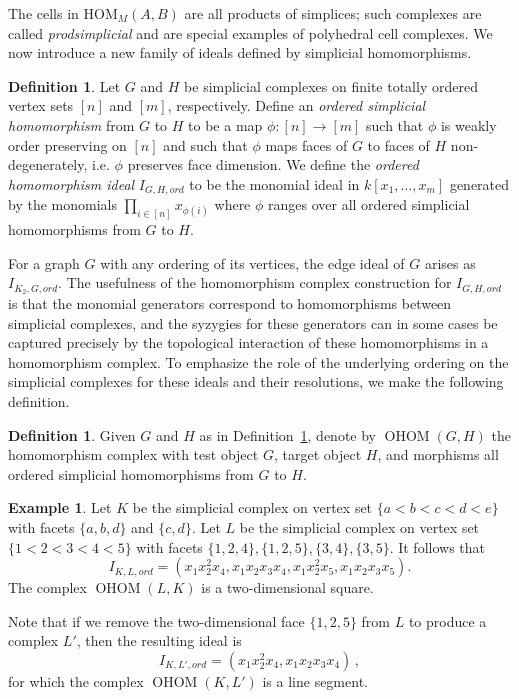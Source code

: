 \documentclass[11pt]{amsart}
\theoremstyle{definition}
\newtheorem{definition}[theorem]{Definition}
\newtheorem{example}[theorem]{Example}
\numberwithin{equation}{section}
\theoremstyle{remark}
\numberwithin{equation}{section}
\begin{document}
The cells in $\mathrm{HOM}_M(A,B)$ are all products of simplices; such complexes are called \emph{prodsimplicial} and are special examples of polyhedral cell complexes.
We now introduce a new family of ideals defined by simplicial homomorphisms.

\begin{definition}\label{ordereddef}
Let $G$ and $H$ be simplicial complexes on finite totally ordered vertex sets $[n]$ and $[m]$, respectively.
Define an \emph{ordered simplicial homomorphism} from $G$ to $H$ to be a map $\phi:[n]\rightarrow [m]$ such that $\phi$ is weakly order preserving on $[n]$ and such that $\phi$ maps faces of $G$ to faces of $H$ non-degenerately, i.e. $\phi$ preserves face dimension.
We define the \emph{ordered homomorphism ideal} $I_{G,H,ord}$ to be the monomial ideal in $k[x_1,\ldots,x_m]$ generated by the monomials $\prod_{i\in[n]}x_{\phi(i)}$ where $\phi$ ranges over all ordered simplicial homomorphisms from $G$ to $H$.
\end{definition}

For a graph $G$ with any ordering of its vertices, the edge ideal of $G$ arises as $I_{K_2,G,ord}$.
The usefulness of the homomorphism complex construction for $I_{G,H,ord}$ is that the monomial generators correspond to homomorphisms between simplicial complexes, and the syzygies for these generators can in some cases be captured precisely by the topological interaction of these homomorphisms in a homomorphism complex.
To emphasize the role of the underlying ordering on the simplicial complexes for these ideals and their resolutions, we make the following definition.

\begin{definition}
Given $G$ and $H$ as in Definition~\ref{ordereddef}, denote by $\operatorname{OHOM}(G,H)$ the homomorphism complex with test object $G$, target object $H$, and morphisms all ordered simplicial homomorphisms from $G$ to $H$.
\end{definition}

\begin{example}
Let $K$ be the simplicial complex on vertex set $\{a<b<c<d<e\}$ with facets $\{a,b,d\}$ and $\{c,d\}$.  
Let $L$ be the simplicial complex on vertex set $\{1<2<3<4<5\}$ with facets $\{1,2,4\},\{1,2,5\},\{3,4\},\{3,5\}$.
It follows that
\[I_{K,L,ord}=\left( x_1x_2^2x_4,x_1x_2x_3x_4,x_1x_2^2x_5,x_1x_2x_3x_5 \right).\]
The complex $\operatorname{OHOM}(L,K)$ is a two-dimensional square.

Note that if we remove the two-dimensional face $\{1,2,5\}$ from $L$ to produce a complex $L'$, then the resulting ideal is
\[I_{K,L',ord}=\left( x_1x_2^2x_4,x_1x_2x_3x_4 \right) \, , \]
for which the complex $\operatorname{OHOM}(K,L')$ is a line segment.
\end{example}
\end{document}
